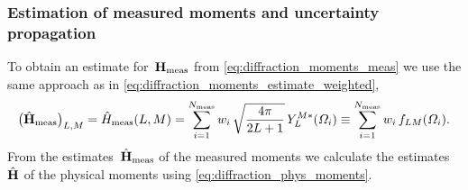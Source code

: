 \subsubsection{Estimation of measured moments and uncertainty propagation}%
\label{sec:diffraction:estimation_uncert}

To obtain an estimate for~$\bm{\mathrm{H}}_\text{meas}$ from
\cref{eq:diffraction_moments_meas} we use the same approach as in
\cref{eq:diffraction_moments_estimate_weighted}, \ie
\begin{equation}
  \label{eq:diffraction_moments_meas_estimate_weighted}
  \rBrk[1]{\hat{\vect{H}}_\text{meas}}_{L, M}
  = \hat{H}_\text{meas}(L, M)
  = \sum_{i = 1}^{N_\text{meas}} w_i\, \sqrt{\frac{4 \pi}{2 L + 1}}\, Y_L^{M *}(\Omega_i)
  \equiv \sum_{i = 1}^{N_\text{meas}} w_i\, f_{L M}(\Omega_i).
\end{equation}
From the estimates~$\hat{\bm{\mathrm{H}}}_\text{meas}$ of the measured
moments we calculate the estimates~$\hat{\bm{\mathrm{H}}}$ of the physical
moments using \cref{eq:diffraction_phys_moments}.


